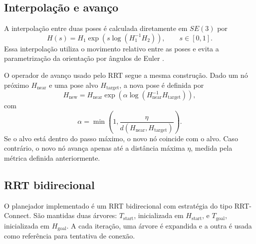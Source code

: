 \documentclass[12pt,a4paper]{article}
\begin{document}
\subsection{Interpolação e avanço}

A interpolação entre duas poses é calculada diretamente em \(SE(3)\) por
\[
H(s)
=
H_1
\exp\left(
s\log(H_1^{-1}H_2)
\right),
\qquad
s\in[0,1].
\]
Essa interpolação utiliza o movimento relativo entre as poses e evita a
parametrização da orientação por ângulos de Euler
\cite{LynchPark2017,Barfoot2017}.

O operador de avanço usado pelo RRT segue a mesma construção. Dado um nó próximo
\(H_{\mathrm{near}}\) e uma pose alvo \(H_{\mathrm{target}}\), a nova pose é
definida por
\[
H_{\mathrm{new}}
=
H_{\mathrm{near}}
\exp\left(
\alpha
\log(H_{\mathrm{near}}^{-1}H_{\mathrm{target}})
\right),
\]
com
\[
\alpha =
\min\left(
1,
\frac{\eta}{d(H_{\mathrm{near}},H_{\mathrm{target}})}
\right).
\]
Se o alvo está dentro do passo máximo, o novo nó coincide com o alvo. Caso
contrário, o novo nó avança apenas até a distância máxima \(\eta\), medida pela
métrica definida anteriormente.

\subsection{RRT bidirecional}

O planejador implementado é um RRT bidirecional com estratégia do tipo
RRT-Connect. São mantidas duas árvores: \(T_{\mathrm{start}}\), inicializada em
\(H_{\mathrm{start}}\), e \(T_{\mathrm{goal}}\), inicializada em
\(H_{\mathrm{goal}}\). A cada iteração, uma árvore é expandida e a outra é usada
como referência para tentativa de conexão.
\end{document}
